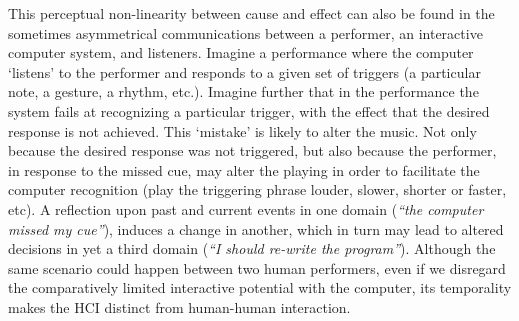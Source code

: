 This perceptual non-linearity between cause and effect can also be found in the sometimes asymmetrical communications between a performer, an interactive computer system, and listeners. Imagine a performance where the computer `listens' to the performer and responds to a given set of triggers (a particular note, a gesture, a rhythm, etc.). Imagine further that in the performance the system fails at recognizing a particular trigger, with the effect that the desired response is not achieved. This `mistake' is likely to alter the music. Not only because the desired response was not triggered, but also because the performer, in response to the missed cue, may alter the playing in order to facilitate the computer recognition (play the triggering phrase louder, slower, shorter or faster, etc). A reflection upon past and current events in one domain (\emph{``the computer missed my cue''}), induces a change in another, which in turn may lead to altered decisions in yet a third domain (\emph{``I should re-write the program''}). Although the same scenario could happen between two human performers, even if we disregard the comparatively limited interactive potential with the computer, its temporality makes the HCI distinct from human-human interaction. 


